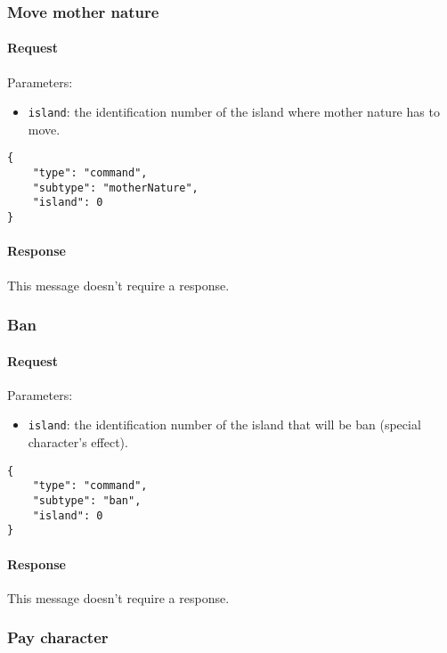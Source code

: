 \documentclass[a4paper]{article}
\begin{document}
	\subsubsection{Move mother nature}

	\paragraph{Request} Parameters:

	\begin{itemize}
		\item \verb|island|: the identification number of the island where mother nature has to move.
	\end{itemize}

	\begin{verbatim}
{
	"type": "command",
	"subtype": "motherNature",
	"island": 0
}
	\end{verbatim}

	\paragraph{Response} This message doesn't require a response.

	\subsubsection{Ban}

	\paragraph{Request} Parameters:

	\begin{itemize}
		\item \verb|island|: the identification number of the island that will be ban (special character's effect).
	\end{itemize}

	\begin{verbatim}
{
	"type": "command",
	"subtype": "ban",
	"island": 0
}
	\end{verbatim}

	\paragraph{Response} This message doesn't require a response.

	\subsubsection{Pay character}
\end{document}
